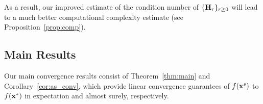 \documentclass[10pt,twocolumn,journal]{IEEEtran}
\begin{document}
\begin{remark}
As a result, our improved estimate of the condition number of $\{\mathbf{H}_r\}_{r\ge 0}$ will lead to a much better computational complexity estimate (see Proposition~\ref{prop:comp}). %
\end{remark}


\subsection{Main Results}

Our main convergence results consist of Theorem~\ref{thm:main} and Corollary~\ref{cor:as_conv}, which provide linear convergence guarantees of $f(\mathbf{x}^s)$ to $f(\mathbf{x}^*)$ in expectation and almost surely, respectively. 

\end{document}
